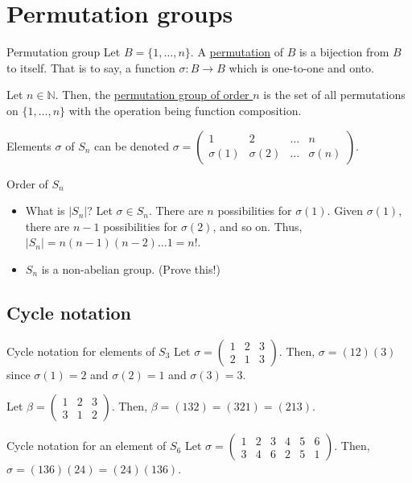 \documentclass[12pt]{article}
\newcommand{\N}{\mathbb{N}}
\begin{document}
	\section{Permutation groups}
	\begin{mydef}{Permutation group}{}
		Let $B=\{1, \dots, n\}$. A \underline{permutation} of $B$ is a bijection from $B$ to itself. That is to say, a function $\sigma:B\to B$ which is one-to-one and onto.
		
		Let $n\in\N$. Then, the \underline{permutation group of order $n$} is the set of all permutations on $\{1, \dots, n\}$ with the operation being function composition.
		
		Elements $\sigma$ of $S_n$ can be denoted $\sigma=\begin{pmatrix}1&2&\dots&n\\\sigma(1)&\sigma(2)&\dots&\sigma(n)\end{pmatrix}$.
	\end{mydef}
	
	\begin{myrem}{Order of $S_n$}{}
		\begin{itemize}
			\item What is $|S_n|$? Let $\sigma\in S_n$. There are $n$ possibilities for $\sigma(1)$. Given $\sigma(1)$, there are $n-1$ possibilities for $\sigma(2)$, and so on. Thus, $|S_n|=n(n-1)(n-2)\dots1=n!$.
			
			\item $S_n$ is a non-abelian group. (Prove this!)
		\end{itemize}
	\end{myrem}
	
	\subsection{Cycle notation}
	\begin{myex}{Cycle notation for elements of $S_3$}{}
		Let $\sigma=\begin{pmatrix}1&2&3\\2&1&3\end{pmatrix}$. Then, $\sigma=(12)(3)$ since $\sigma(1)=2$ and $\sigma(2)=1$ and $\sigma(3)=3$.
		
		Let $\beta=\begin{pmatrix}1&2&3\\3&1&2\end{pmatrix}$. Then, $\beta=(132)=(321)=(213)$.
	\end{myex}
	
	\begin{myex}{Cycle notation for an element of $S_6$}{}
		Let $\sigma=\begin{pmatrix}1&2&3&4&5&6\\3&4&6&2&5&1\end{pmatrix}$. Then, $\sigma=(136)(24)=(24)(136)$.
	\end{myex}
	
\end{document}
